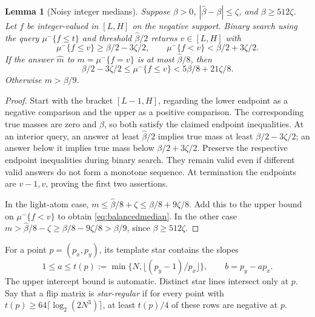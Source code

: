\documentclass[11pt]{article}
\newtheorem{lemma}[theorem]{Lemma}
\newcommand{\1}{\mathbf 1}
\begin{document}
\begin{samepage}
\begin{lemma}[Noisy integer medians]\label{lem:median}
Suppose $\beta>0$, $|\widehat\beta-\beta|\le\zeta$, and $\beta\ge512\zeta$. Let $f$ be integer-valued in $[L,H]$ on the negative support. Binary search using the query $\mu^-\{f\le t\}$ and threshold $\widehat\beta/2$ returns $v\in[L,H]$ with
\[
 \mu^-\{f\le v\}\ge\beta/2-3\zeta/2,
 \qquad
 \mu^-\{f<v\}<\beta/2+3\zeta/2.
\]
If the answer $\widehat m$ to $m=\mu^-\{f=v\}$ is at most $\widehat\beta/8$, then
\begin{equation}\label{eq:balancedmedian}
 \beta/2-3\zeta/2\le\mu^-\{f\le v\}
 <5\beta/8+21\zeta/8.
\end{equation}
Otherwise $m>\beta/9$.
\end{lemma}
\end{samepage}
\begin{proof}
Start with the bracket $[L-1,H]$, regarding the lower endpoint as a negative comparison and the upper as a positive comparison. The corresponding true masses are zero and $\beta$, so both satisfy the claimed endpoint inequalities. At an interior query, an answer at least $\widehat\beta/2$ implies true mass at least $\beta/2-3\zeta/2$; an answer below it implies true mass below $\beta/2+3\zeta/2$. Preserve the respective endpoint inequalities during binary search. They remain valid even if different valid answers do not form a monotone sequence. At termination the endpoints are $v-1,v$, proving the first two assertions.

In the light-atom case, $m\le\widehat\beta/8+\zeta\le\beta/8+9\zeta/8$. Add this to the upper bound on $\mu^-\{f<v\}$ to obtain \eqref{eq:balancedmedian}. In the other case $m>\widehat\beta/8-\zeta\ge\beta/8-9\zeta/8>\beta/9$, since $\beta\ge512\zeta$.
\end{proof}

For a point $p=(p_x,p_y)$, its template star contains the slopes
\[
 1\le a\le t(p):=\min\{N,\lfloor(p_y-1)/p_x\rfloor\},
 \qquad b=p_y-ap_x.
\]
The upper intercept bound is automatic. Distinct star lines intersect only at $p$. Say that a flip matrix is \emph{star-regular} if for every point with $t(p)\ge64\lceil\log_2(2N^3)\rceil$, at least $t(p)/4$ of these rows are negative at $p$.
\end{document}
